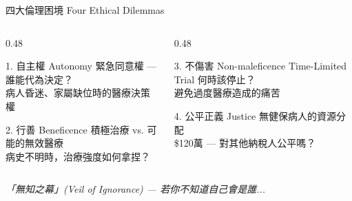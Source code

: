 \documentclass[aspectratio=169,12pt]{beamer}
\begin{document}
\begin{frame}{四大倫理困境 Four Ethical Dilemmas}

\begin{columns}[T]
\begin{column}{0.48\textwidth}
\begin{block}{1. 自主權 Autonomy}
緊急同意權 — 誰能代為決定？\\
\small{病人昏迷、家屬缺位時的醫療決策權}
\end{block}

\vspace{0.3cm}

\begin{block}{2. 行善 Beneficence}
積極治療 vs. 可能的無效醫療\\
\small{病史不明時，治療強度如何拿捏？}
\end{block}
\end{column}

\begin{column}{0.48\textwidth}
\begin{block}{3. 不傷害 Non-maleficence}
Time-Limited Trial 何時該停止？\\
\small{避免過度醫療造成的痛苦}
\end{block}

\vspace{0.3cm}

\begin{block}{4. 公平正義 Justice}
無健保病人的資源分配\\
\small{\$120萬 — 對其他納稅人公平嗎？}
\end{block}
\end{column}
\end{columns}

\vspace{0.5cm}
\centering
\textit{「無知之幕」(Veil of Ignorance) — 若你不知道自己會是誰...}
\end{frame}
\end{document}
